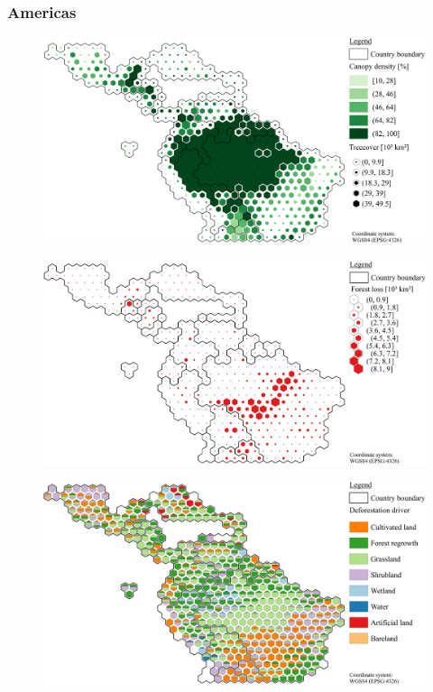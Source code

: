         \subsubsection{Americas}
            \begin{figure}[ht]
                \centering
		        \includegraphics[scale=1]{img/americas_treecover_frameless}
		        \caption[Ecosystem service values]{}
		        \label{fig:americascover}
	        \end{figure}
	        \begin{figure}[ht]
		        \centering
		        \includegraphics[scale=1]{img/americas_loss_frameless}
		        \caption[Ecosystem service values]{}
		        \label{fig:americasloss}
	        \end{figure}
	        \begin{figure}[ht]
		        \centering
		        \includegraphics[scale=1]{img/americas_driver_frameless}
		        \caption[Ecosystem service values]{}
		        \label{fig:americasdriver}
	        \end{figure}

